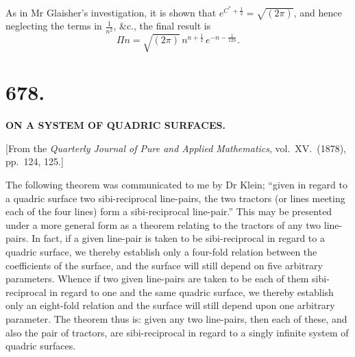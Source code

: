 \documentclass[11pt,a4paper]{article}
\begin{document}
As in Mr Glaisher's investigation, it is shown that $e^{C^{*} + \frac{1}{2}} = \sqrt{(2\pi)}$, and hence neglecting the terms in $\tfrac{1}{n^{2}}$, \&c., the final result is
\[
\Pi n = \sqrt{(2\pi)}\,n^{n + \frac{1}{2}}\,e^{-n - \frac{1}{12n}}.
\]

\newpage



\section*{678.}

\begin{center}
\textbf{ON A SYSTEM OF QUADRIC SURFACES.}
\end{center}

\medskip

\begin{center}
[From the \emph{Quarterly Journal of Pure and Applied Mathematics}, vol.~XV.\ (1878), pp.~124, 125.]
\end{center}

\medskip

\noindent The following theorem was communicated to me by Dr Klein; ``given in regard to a quadric surface two sibi-reciprocal line-pairs, the two tractors (or lines meeting each of the four lines) form a sibi-reciprocal line-pair.'' This may be presented under a more general form as a theorem relating to the tractors of any two line-pairs. In fact, if a given line-pair is taken to be sibi-reciprocal in regard to a quadric surface, we thereby establish only a four-fold relation between the coefficients of the surface, and the surface will still depend on five arbitrary parameters. Whence if two given line-pairs are taken to be each of them sibi-reciprocal in regard to one and the same quadric surface, we thereby establish only an eight-fold relation and the surface will still depend upon one arbitrary parameter. The theorem thus is: given any two line-pairs, then each of these, and also the pair of tractors, are sibi-reciprocal in regard to a singly infinite system of quadric surfaces.

\medskip
\end{document}
